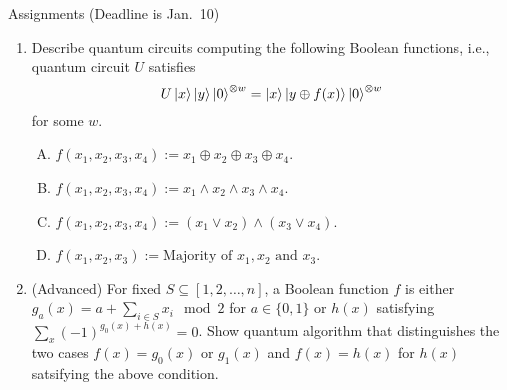 \documentclass{beamer}
\begin{document}
\begin{frame}{Assignments (Deadline is Jan.\ 10)}
\begin{enumerate}
\setlength{\itemsep}{2em}
\item Describe quantum circuits computing the following Boolean functions, i.e., quantum circuit $U$ satisfies
\begin{equation*}
U\ket{x}\ket{y}\ket{0}^{\otimes w} = \ket{x}\ket{y\oplus f(x)}\ket{0}^{\otimes w}
\end{equation*}
for some $w$.
\begin{enumerate}[(A)]
\item $f(x_1,x_2,x_3,x_4):= x_1\oplus x_2\oplus x_3\oplus x_4$.
\item $f(x_1,x_2,x_3,x_4):= x_1\wedge x_2\wedge x_3\wedge x_4$.
\item $f(x_1,x_2,x_3,x_4):= (x_1\vee x_2)\wedge (x_3\vee x_4)$.
\item $f(x_1,x_2,x_3):= \text{Majority of } x_1, x_2 \text{ and } x_3$.
\end{enumerate}
\item (Advanced) For fixed $S\subseteq [1,2,\dotsc,n]$, a Boolean function $f$ is either $g_a(x)=a+\sum_{i\in S} x_i \mod 2$ for $a\in\{0,1\}$ or $h(x)$ satisfying $\sum_{x} (-1)^{g_0(x)+h(x)} = 0$.
Show quantum algorithm that distinguishes the two cases $f(x)=g_0(x) \text{ or } g_1(x)$ and $f(x)=h(x)$ for $h(x)$ satsifying the above condition.
\end{enumerate}
\end{frame}
\end{document}
